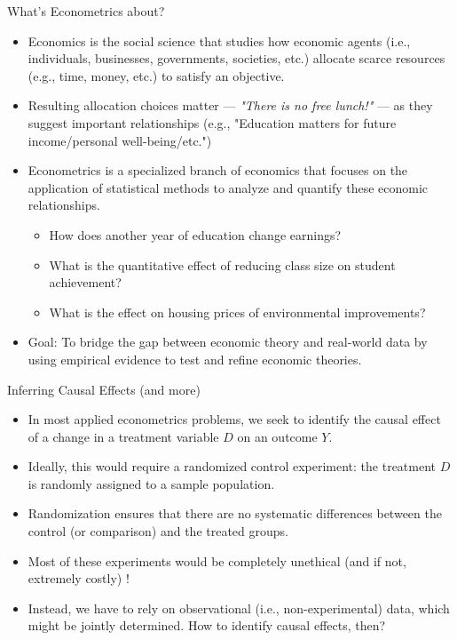\documentclass[notes,10pt, aspectratio=169]{beamer}
\begin{document}
\begin{frame}{What's Econometrics about?}
    \begin{itemize}
        \item[-] Economics is the social science that studies how economic agents (i.e., individuals, businesses, governments, societies, etc.) allocate scarce resources (e.g., time, money, etc.) to satisfy an objective.\vspace{.2cm}
        \item[-] Resulting allocation choices matter --- \textit{"There is no free lunch!"}  --- as they suggest important relationships (e.g., "Education matters for future income/personal well-being/etc.")\vspace{.2cm}
        \item[-] Econometrics is a specialized branch of economics that focuses on the application of statistical methods to analyze and quantify these economic relationships.\vspace{.2cm}
        \begin{itemize}
            \item[$\rightarrow$] How does another year of education change earnings?
            \item[$\rightarrow$]  What is the quantitative effect of reducing class size on student achievement?
            \item[$\rightarrow$] What is the effect on housing prices of environmental improvements?
        \end{itemize}\vspace{.2cm}
        \item[-] Goal: To bridge the gap between economic theory and real-world data by using empirical evidence to test and refine economic theories.
    \end{itemize}
\end{frame}


\begin{frame}{Inferring Causal Effects (and more)}
    \begin{itemize}
         \item[-] In most applied econometrics problems, we seek to identify the causal effect of a change in a treatment variable $D$ on an outcome $Y$.\vspace{.2cm}
         \item[-] Ideally, this would require a randomized control experiment: the treatment $D$ is randomly assigned to a sample population.\vspace{.2cm}
         \item[-] Randomization ensures that there are no systematic differences between the control (or comparison) and the treated groups.\vspace{.2cm}
         \item[-] Most of these experiments would be completely unethical (and if not, extremely costly) ! \vspace{.2cm}
        \item[-] Instead, we have to rely on observational (i.e., non-experimental) data, which might be jointly determined. How to identify causal effects, then?
    \end{itemize}
\end{frame}
\end{document}
